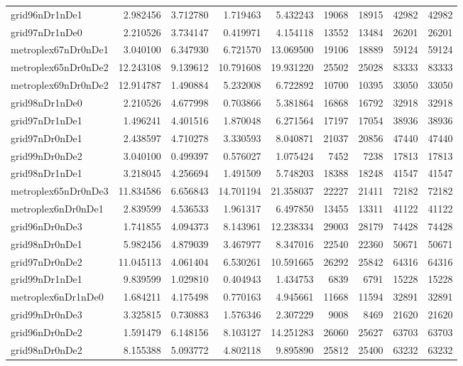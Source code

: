 \begin{longtable}{|l|r|r|r|r|r|r|r|r|}
grid96nDr1nDe1 & 2.982456 & 3.712780 & 1.719463 & 5.432243 & 19068 & 18915 & 42982 & 42982 \\
grid97nDr1nDe0 & 2.210526 & 3.734147 & 0.419971 & 4.154118 & 13552 & 13484 & 26201 & 26201 \\
metroplex67nDr0nDe1 & 3.040100 & 6.347930 & 6.721570 & 13.069500 & 19106 & 18889 & 59124 & 59124 \\
metroplex65nDr0nDe2 & 12.243108 & 9.139612 & 10.791608 & 19.931220 & 25502 & 25028 & 83333 & 83333 \\
metroplex69nDr0nDe2 & 12.914787 & 1.490884 & 5.232008 & 6.722892 & 10700 & 10395 & 33050 & 33050 \\
grid98nDr1nDe0 & 2.210526 & 4.677998 & 0.703866 & 5.381864 & 16868 & 16792 & 32918 & 32918 \\
grid97nDr1nDe1 & 1.496241 & 4.401516 & 1.870048 & 6.271564 & 17197 & 17054 & 38936 & 38936 \\
grid97nDr0nDe1 & 2.438597 & 4.710278 & 3.330593 & 8.040871 & 21037 & 20856 & 47440 & 47440 \\
grid99nDr0nDe2 & 3.040100 & 0.499397 & 0.576027 & 1.075424 & 7452 & 7238 & 17813 & 17813 \\
grid98nDr1nDe1 & 3.218045 & 4.256694 & 1.491509 & 5.748203 & 18388 & 18248 & 41547 & 41547 \\
metroplex65nDr0nDe3 & 11.834586 & 6.656843 & 14.701194 & 21.358037 & 22227 & 21411 & 72182 & 72182 \\
metroplex6nDr0nDe1 & 2.839599 & 4.536533 & 1.961317 & 6.497850 & 13455 & 13311 & 41122 & 41122 \\
grid96nDr0nDe3 & 1.741855 & 4.094373 & 8.143961 & 12.238334 & 29003 & 28179 & 74428 & 74428 \\
grid98nDr0nDe1 & 5.982456 & 4.879039 & 3.467977 & 8.347016 & 22540 & 22360 & 50671 & 50671 \\
grid97nDr0nDe2 & 11.045113 & 4.061404 & 6.530261 & 10.591665 & 26292 & 25842 & 64316 & 64316 \\
grid99nDr1nDe1 & 9.839599 & 1.029810 & 0.404943 & 1.434753 & 6839 & 6791 & 15228 & 15228 \\
metroplex6nDr1nDe0 & 1.684211 & 4.175498 & 0.770163 & 4.945661 & 11668 & 11594 & 32891 & 32891 \\
grid99nDr0nDe3 & 3.325815 & 0.730883 & 1.576346 & 2.307229 & 9008 & 8469 & 21620 & 21620 \\
grid96nDr0nDe2 & 1.591479 & 6.148156 & 8.103127 & 14.251283 & 26060 & 25627 & 63703 & 63703 \\
grid98nDr0nDe2 & 8.155388 & 5.093772 & 4.802118 & 9.895890 & 25812 & 25400 & 63232 & 63232 \\

\end{longtable}
